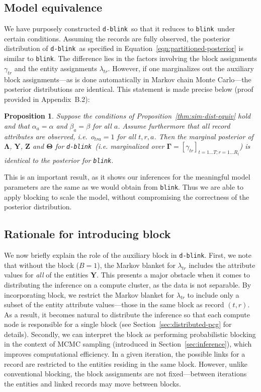 \documentclass[12pt,letterpaper]{article}
\renewcommand\vec{\bm}
\newcommand{\1}[1]{\mathbb{I}\!\left[#1\right]} %
\newcommand{\dblink}{\texttt{\upshape \lowercase{d-blink}}} %
\newcommand{\blink}{\texttt{\upshape \lowercase{blink}}} %
\newtheorem{proposition}{Proposition}
\begin{document}
\subsection{Model equivalence}
\label{sec:posterior-dist}
We have purposely constructed \dblink\ so that it  
reduces to \blink\ under certain conditions. 
Assuming the records are fully observed, the posterior distribution 
of \dblink\ as specified in Equation~\ref{eqn:partitioned-posterior} 
is similar to \blink. 
The difference lies in the factors involving the block assignments 
$\gamma_{tr}$ and the entity assignments $\lambda_{tr}$. 
However, if one marginalizes out the auxiliary block assignments---as is 
done automatically in Markov chain Monte Carlo---the 
posterior distributions are identical.
This statement is made precise below (proof provided in Appendix~B.2):
\begin{proposition}
  \label{thm:posterior-equiv}
  Suppose the conditions of Proposition~\ref{thm:sim-dist-equiv} hold
  and that $\alpha_{a} = \alpha$ and $\beta_{a} = \beta$ for 
  all $a$. 
  Assume furthermore that all record attributes are observed, i.e.\ 
  $o_{tra} = 1$ for all $t, r, a$.
  Then the marginal posterior of $\vec{\Lambda}$, $\vec{Y}$, 
  $\vec{Z}$ and $\vec{\Theta}$ for \dblink\ (i.e. marginalized 
  over $\vec{\Gamma} = [\gamma_{tr}]_{t = 1 \ldots T; r = 1 \ldots R_t}$)
  is identical to the posterior for \blink.
\end{proposition}

This is an important result, as it shows our inferences for the 
meaningful model parameters are the same as we would obtain from \blink. 
Thus we are able to apply blocking to scale the model, without compromising 
the correctness of the posterior distribution.

\subsection{Rationale for introducing block}
\label{sec:partition-motivation}
We now briefly explain the role of the auxiliary block in \dblink.
First, we note that without the block ($B = 1$), the Markov blanket for 
$\lambda_{tr}$ includes the attribute values for \emph{all} of the 
entities $\vec{Y}$.
This presents a major obstacle when it comes to distributing the inference 
on a compute cluster, as the data is not separable.
By incorporating block, we restrict the Markov blanket for $\lambda_{tr}$ 
to include only a subset of the entity attribute values---those in the 
same block as record $(t,r)$.
As a result, it becomes natural to distribute the inference so that each 
compute node is responsible for a single block (see 
Section~\ref{sec:distributed-pcg} for details).
Secondly, we can interpret the block as performing probabilistic blocking in 
the context of MCMC sampling (introduced in Section~\ref{sec:inference}), 
which improves computational efficiency.
In a given iteration, the possible links for a record are restricted to the 
entities residing in the same block.
However, unlike conventional blocking, the block assignments are not 
fixed---between iterations the entities and linked records may move 
between blocks.
\end{document}
